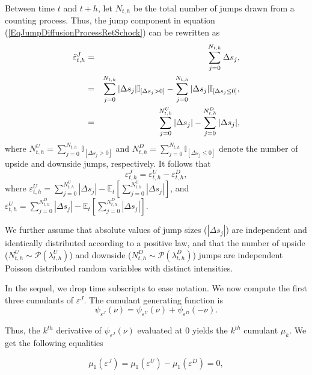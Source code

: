 \documentclass[11pt]{article}
\begin{document}
\begin{small}
Between time $t$ and $t+h$, let $N_{t,h}$ be the total number of jumps drawn from a counting process. Thus, the jump component in equation (\ref{EqJumpDiffusionProcessRetSchock}) can be rewritten as
\begin{eqnarray}
\tilde{\varepsilon}_{t,h}^{J} &=& \sum_{j=0}^{N_{t,h}} \Delta s_{j},  \notag \\
&=& \sum_{j=0}^{N_{t,h}} | \Delta s_{j} | \mathbb{I}_{[\Delta s_{j} > 0]} - \sum_{j=0}^{N_{t,h}} | \Delta s_{j} | \mathbb{I}_{[\Delta s_{j} \leq 0]},  \notag \\
&=& \sum_{j=0}^{N_{t,h}^{U}} | \Delta s_{j} | - \sum_{j=0}^{N_{t,h}^{D}} | \Delta s_{j} |,
\end{eqnarray}
where $N_{t,h}^{U}=\sum_{j=0}^{N_{t,h}} \mathbb{I}_{[\Delta s_{j} > 0]}$ and $N_{t,h}^{D}=\sum_{j=0}^{N_{t,h}} \mathbb{I}_{[\Delta s_{j} \leq 0]}$ denote the number of upside and downside jumps, respectively.
It follows that
\begin{equation}
\varepsilon_{t,h}^{J} = \varepsilon_{t,h}^{U}-\varepsilon_{t,h}^{D},
\end{equation}
where $\varepsilon_{t,h}^{U} = \sum_{j=0}^{N_{t,h}^{U}} | \Delta s_{j} | - \mathbb{E}_{t} \left[ \sum_{j=0}^{N_{t,h}^{U}} | \Delta s_{j} | \right]$, and $\varepsilon_{t,h}^{U} = \sum_{j=0}^{N_{t,h}^{D}} | \Delta s_{j} | - \mathbb{E}_{t} \left[ \sum_{j=0}^{N_{t,h}^{D}} | \Delta s_{j} | \right]$.

We further assume that absolute values of jump sizes ($| \Delta s_{j} |$) are independent and identically distributed according to a positive law, and that the number of upside ($N_{t,h}^{U} \sim \mathcal{P} (\lambda_{t,h}^{U}) $) and downside ($N_{t,h}^{D} \sim \mathcal{P} (\lambda_{t,h}^{D}) $) jumps are independent Poisson distributed random variables with distinct intensities.


In the sequel, we drop time subscripts to ease notation. We now compute the first three cumulants of $\varepsilon^{J}$. The cumulant generating function is
\begin{equation}
\psi_{\varepsilon^{J}}(\nu) = \psi_{\varepsilon^{U}}(\nu) + \psi_{\varepsilon^{D}}(-\nu). \label{CGF}
\end{equation}

Thus, the $k^{th}$ derivative of $\psi_{\varepsilon^{J}}(\nu)$ evaluated at 0 yields the $k^{th}$ cumulant $\mu_{k}$. We get the following equalities

\begin{equation}
\mu_{1}(\varepsilon^{J}) = \mu_{1}(\varepsilon^{U}) - \mu_{1}(\varepsilon^{D}) =0, \label{CGFM}
\end{equation}



\end{small}
\end{document}
